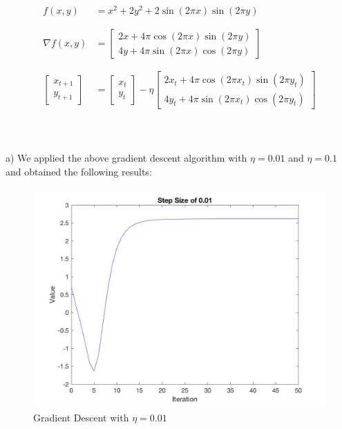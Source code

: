 \documentclass[12pt]{article}
\begin{document}
 \\\\
\begin{align*}\displaystyle
f(x,y)&=x^2+2y^2+2\sin(2\pi x)\sin(2\pi y)\\\\\\
\nabla f(x,y)&=
\begin{bmatrix}
2x+4\pi \cos(2\pi x)\sin(2\pi y)\\
4y+4\pi \sin(2\pi x)\cos(2\pi y)
\end{bmatrix}\\\\\\
\begin{bmatrix}
x_{t+1}\\
y_{t+1}
\end{bmatrix}
&=
\begin{bmatrix}
x_{t}\\
y_{t}
\end{bmatrix}
-\eta
\begin{bmatrix}
2x_t+4\pi \cos(2\pi x_t)\sin(2\pi y_t)\\
4y_t+4\pi \sin(2\pi x_t)\cos(2\pi y_t)
\end{bmatrix}
\end{align*}\\\\\\
\indent a) We applied the above gradient descent algorithm with $\eta = 0.01$ and $\eta = 0.1$ and obtained the following results:
\begin{figure}[H]
  \centering
  \includegraphics[scale = 0.3]{Pic5.jpg}
  \caption{Gradient Descent with $\eta = 0.01$}
  \label{fig:Pic5}
\end{figure}
\end{document}
